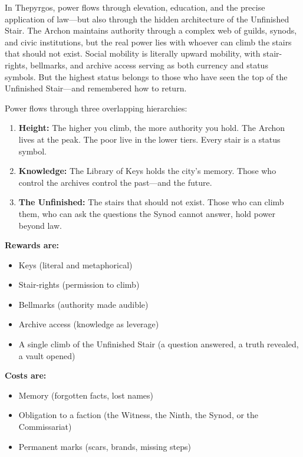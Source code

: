 \begin{tcolorbox}[colback=black!3,colframe=black!40!white,title={Patronage \& Power},breakable]
In Thepyrgos, power flows through elevation, education, and the precise application of law---but also through the hidden architecture of the Unfinished Stair. The Archon maintains authority through a complex web of guilds, synods, and civic institutions, but the real power lies with whoever can climb the stairs that should not exist. Social mobility is literally upward mobility, with stair-rights, bellmarks, and archive access serving as both currency and status symbols. But the highest status belongs to those who have seen the top of the Unfinished Stair---and remembered how to return.

Power flows through three overlapping hierarchies:
\begin{enumerate}
\item \textbf{Height:} The higher you climb, the more authority you hold. The Archon lives at the peak. The poor live in the lower tiers. Every stair is a status symbol.
\item \textbf{Knowledge:} The Library of Keys holds the city's memory. Those who control the archives control the past---and the future.
\item \textbf{The Unfinished:} The stairs that should not exist. Those who can climb them, who can ask the questions the Synod cannot answer, hold power beyond law.
\end{enumerate}

\textbf{Rewards are:}
\begin{itemize}
\item Keys (literal and metaphorical)
\item Stair-rights (permission to climb)
\item Bellmarks (authority made audible)
\item Archive access (knowledge as leverage)
\item A single climb of the Unfinished Stair (a question answered, a truth revealed, a vault opened)
\end{itemize}

\textbf{Costs are:}
\begin{itemize}
\item Memory (forgotten facts, lost names)
\item Obligation to a faction (the Witness, the Ninth, the Synod, or the Commissariat)
\item Permanent marks (scars, brands, missing steps)
\end{itemize}


\end{tcolorbox}
